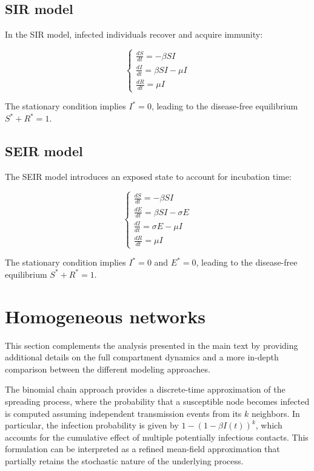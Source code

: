 \subsection{SIR model}

In the SIR model, infected individuals recover and acquire immunity:

\begin{equation}
\begin{cases}
\frac{dS}{dt} = -\beta S I \\
\frac{dI}{dt} = \beta S I - \mu I \\
\frac{dR}{dt} = \mu I
\end{cases}
\end{equation}

The stationary condition implies $I^*=0$, leading to the disease-free equilibrium $S^*+R^*=1$.

\subsection{SEIR model}

The SEIR model introduces an exposed state to account for incubation time:

\begin{equation}
\begin{cases}
\frac{dS}{dt} = -\beta S I \\
\frac{dE}{dt} = \beta S I - \sigma E \\
\frac{dI}{dt} = \sigma E - \mu I \\
\frac{dR}{dt} = \mu I
\end{cases}
\end{equation}

The stationary condition implies $I^*=0$ and $E^*=0$, leading to the disease-free equilibrium $S^*+R^*=1$.


\section{Homogeneous networks}\label{app:hom_net}

This section complements the analysis presented in the main text by providing additional details on the full compartment dynamics and a more in-depth comparison between the different modeling approaches.

The binomial chain approach provides a discrete-time approximation of the spreading process, where the probability that a susceptible node becomes infected is computed assuming independent transmission events from its $k$ neighbors. In particular, the infection probability is given by $1 - (1 - \beta I(t))^k$, which accounts for the cumulative effect of multiple potentially infectious contacts. This formulation can be interpreted as a refined mean-field approximation that partially retains the stochastic nature of the underlying process.

